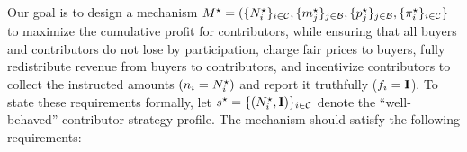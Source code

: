 Our goal is to design a  mechanism $M^\star = (\{N^\star_i\}_{i\in\mathcal{C}}, \{m^\star_j\}_{j\in\mathcal{B}},
\{p^\star_j\}_{j\in\mathcal{B}}, \{\pi^\star_i\}_{i\in\mathcal{C}}\}$ to maximize the cumulative profit for contributors, while ensuring that all buyers and contributors do not lose by participation, charge fair prices to buyers, fully redistribute revenue from buyers to contributors,
and incentivize contributors to collect the instructed amounts $(n_i=N^\star_i)$ and report it truthfully ($f_i={\rm \bf I}$).
To state these requirements formally, let
 $s^\star = \{(N^\star_i, {\rm \bf I})\}_{i\in\mathcal{C}}$ denote the ``well-behaved''
 contributor strategy profile.
The mechanism should satisfy the following requirements:
